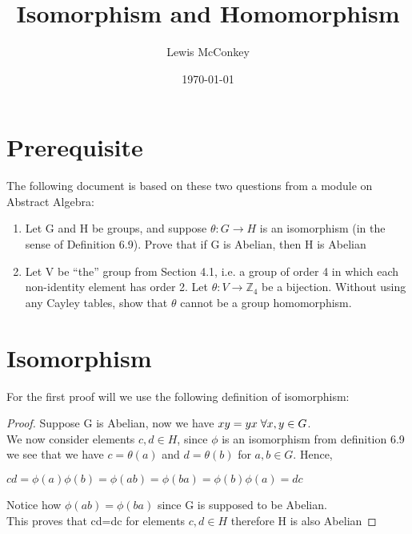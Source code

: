 \documentclass[,oneside]{article}
\author{Lewis McConkey}
\date{\today}
\title{ \LARGE{Isomorphism and Homomorphism}}
\numberwithin{equation}{section}
\newcommand{\Z}{\mathbb{Z}}
\begin{document}
\maketitle
\section{Prerequisite}
The following document is based on these two questions from a module on Abstract Algebra:
\begin{enumerate}[i]
\item Let G and H be groups, and suppose $\theta : G \rightarrow H$ is an isomorphism (in the sense of
Definition 6.9). Prove that if G is Abelian, then H is Abelian
\item Let V be “the” group from Section 4.1, i.e. a group of order 4 in which each non-identity element has order 2. Let $\theta : V \rightarrow \Z_4$ be a bijection. Without using any Cayley tables, show that $\theta$ cannot be a group homomorphism.
\end{enumerate}

\section{Isomorphism}
For the first proof will we use the following definition of isomorphism:\\
\begin{center}
\end{center}
\begin{proof}
Suppose G is Abelian, now we have $xy=yx \hspace{0.1cm}\forall x,y \in G$.\\
We now consider elements $c, d \in H$, since $\phi$ is an isomorphism from definition 6.9 we see that we have $c=\theta(a)$ and $d=\theta(b)$ for $a,b \in G$. Hence, 
\begin{center}
$cd=\phi(a) \phi(b)= \phi(ab)= \phi(ba)=\phi(b)\phi(a)=dc$
\end{center}
Notice how $\phi(ab)=\phi(ba)$ since G is supposed to be Abelian.\\
This proves that cd=dc for elements $c,d \in H$ therefore H is also Abelian 
\end{proof}
\end{document}
